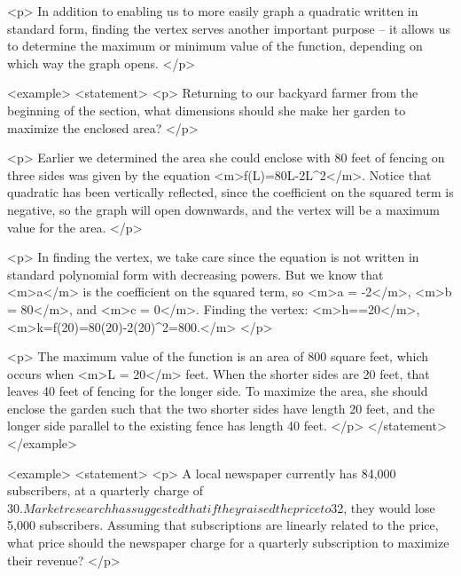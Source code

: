         <p>
            In addition to enabling us to more easily graph a quadratic written in standard form, finding the vertex serves another important purpose – it allows us to determine the maximum or minimum value of the function, depending on which way the graph opens.
        </p>

        <example>
            <statement>
                <p>
                    Returning to our backyard farmer from the beginning of the section, what dimensions should she make her garden to maximize the enclosed area?
                </p>

                <p>
                    Earlier we determined the area she could enclose with 80 feet of fencing on three sides was given by the equation <m>f(L)=80L-2L^{2}</m>.
                    Notice that quadratic has been vertically reflected, since the coefficient on the squared term is negative, so the graph will open downwards, and the vertex will be a maximum value for the area.
                </p>

                <p>
                    In finding the vertex, we take care since the equation is not written in standard polynomial form with decreasing powers.
                    But we know that <m>a</m> is the coefficient on the squared term, so <m>a = -2</m>, <m>b = 80</m>, and <m>c = 0</m>.
                    Finding the vertex: <m>h==20</m>, <m>k=f(20)=80(20)-2(20)^{2}=800.</m>
                </p>

                <p>
                    The maximum value of the function is an area of 800 square feet, which occurs when <m>L = 20</m> feet.
                    When the shorter sides are 20 feet, that leaves 40 feet of fencing for the longer side.
                    To maximize the area, she should enclose the garden such that the two shorter sides have length 20 feet, and the longer side parallel to the existing fence has length 40 feet.
                </p>
            </statement>
        </example>

        <example>
            <statement>
                <p>
                    A local newspaper currently has 84,000 subscribers, at a quarterly charge of $30.
                    Market research has suggested that if they raised the price to $32, they would lose 5,000 subscribers.
                    Assuming that subscriptions are linearly related to the price, what price should the newspaper charge for a quarterly subscription to maximize their revenue?
                </p>

